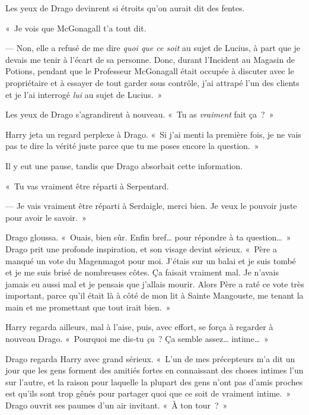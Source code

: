 Les yeux de Drago devinrent si étroits qu'on aurait dit des fentes.

«~Je vois que McGonagall t'a tout dit.

--- Non, elle a refusé de me dire \emph{quoi que ce soit} au sujet de Lucius, à part que je devais me tenir à l'écart de sa personne. Donc, durant l'Incident au Magasin de Potions, pendant que le Professeur McGonagall était occupée à discuter avec le propriétaire et à essayer de tout garder sous contrôle, j'ai attrapé l'un des clients et je l'ai interrogé \emph{lui} au sujet de Lucius.~»

Les yeux de Drago s'agrandirent à nouveau. «~Tu as \emph{vraiment} fait ça~?~»

Harry jeta un regard perplexe à Drago. «~Si j'ai menti la première fois, je ne vais pas te dire la vérité juste parce que tu me poses encore la question.~»

Il y eut une pause, tandis que Drago absorbait cette information.

«~Tu vas vraiment être réparti à Serpentard.

--- Je vais vraiment être réparti à Serdaigle, merci bien. Je veux le pouvoir juste pour avoir le savoir.~»

Drago gloussa. «~Ouais, bien sûr. Enfin bref… pour répondre à ta question…~» Drago prit une profonde inspiration, et son visage devint sérieux. «~Père a manqué un vote du Magenmagot pour moi. J'étais sur un balai et je suis tombé et je me suis brisé de nombreuses côtes. Ça faisait vraiment mal. Je n'avais jamais eu aussi mal et je pensais que j'allais mourir. Alors Père a raté ce vote très important, parce qu'il était là à côté de mon lit à Sainte Mangouste, me tenant la main et me promettant que tout irait bien.~»

Harry regarda ailleurs, mal à l'aise, puis, avec effort, se força à regarder à nouveau Drago. «~Pourquoi me dis-tu \emph{ça}~? Ça semble assez… intime…~»

Drago regarda Harry avec grand sérieux. «~L'un de mes précepteurs m'a dit un jour que les gens forment des amitiés fortes en connaissant des choses intimes l'un sur l'autre, et la raison pour laquelle la plupart des gens n'ont pas d'amis proches est qu'ils sont trop gênés pour partager quoi que ce soit de vraiment intime.~» Drago ouvrit ses paumes d'un air invitant. «~À ton tour~?~»

